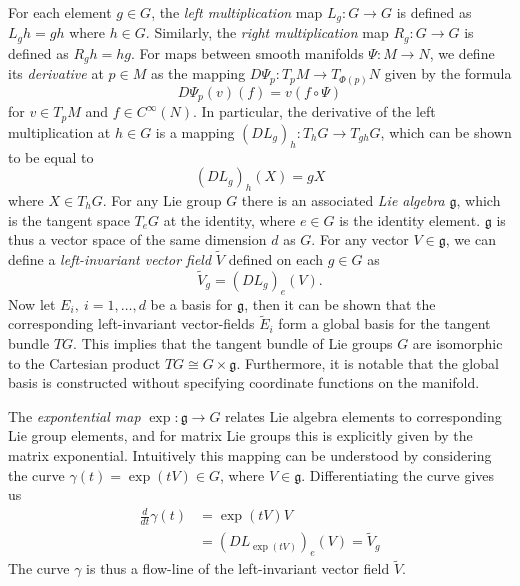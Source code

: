 For each element $g \in G$, the \textit{left multiplication} map $L_g : G \to G$ is defined as $L_g h = gh$ where $h \in G$. Similarly, the \textit{right multiplication} map $R_g : G \to G$ is defined as $R_g h = hg$. For maps between smooth manifolds $\Psi : M \to N$, we define its \textit{derivative} at $p \in M$ as the mapping $D\Psi_p : T_p M \to T_{\Phi(p)} N$ given by the formula
\begin{equation} \label{eq:derivative of linear map}
D\Psi_p (v)(f) = v(f \circ \Psi)
\end{equation}
for $v \in T_p M$ and $f \in C^\infty(N)$. In particular, the derivative of the left multiplication at $h\in G$ is a mapping $(DL_g)_h : T_hG \to T_{gh} G$, which can be shown to be equal to
\begin{equation}
(DL_g)_h(X) = gX
\end{equation}
where $X \in T_h G$. For any Lie group $G$ there is an associated \textit{Lie algebra} $\mathfrak{g}$, which is the tangent space $T_e G$ at the identity, where $e \in G$ is the identity element. $\mathfrak{g}$ is thus a vector space of the same dimension $d$ as $G$. For any vector $V \in \mathfrak{g}$, we can define a \textit{left-invariant vector field} $\tilde{V}$ defined on each $g \in G$ as
\begin{equation} \label{eq:left-invariant vector field}
\tilde{V}_g = (DL_g)_e (V).
\end{equation}
Now let $E_i,\ i=1,\dots,d$ be a basis for $\mathfrak{g}$, then it can be shown that the corresponding left-invariant vector-fields $\tilde{E}_i$ form a global basis for the tangent bundle $TG$. This implies that the tangent bundle of Lie groups $G$ are isomorphic to the Cartesian product $TG \cong G \times \mathfrak{g}$. Furthermore, it is notable that the global basis is constructed without specifying coordinate functions on the manifold.

The \textit{expontential map} $\exp : \mathfrak{g} \to G$ relates Lie algebra elements to corresponding Lie group elements, and for matrix Lie groups this is explicitly given by the matrix exponential. Intuitively this mapping can be understood by considering the curve $\gamma(t) = \exp ( t V ) \in G$, where $V \in \mathfrak{g}$. Differentiating the curve gives us
\begin{equation}
\begin{aligned}
\frac{d}{dt} \gamma(t) & = \exp (t V) V \\
& = (D L_{ \exp (t V) } )_e (V) = \tilde{V}_g
\end{aligned}
\end{equation}
The curve $\gamma$ is thus a flow-line of the left-invariant vector field $\tilde{V}$.

